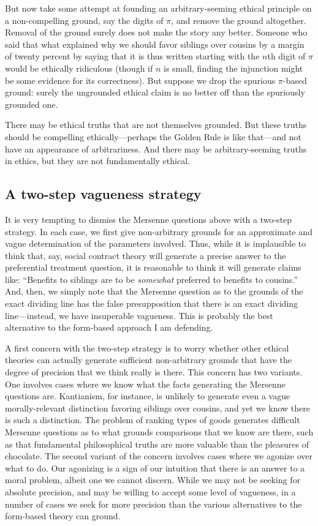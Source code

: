 But now take some attempt at founding an arbitrary-seeming ethical principle on a non-compelling ground, say the digits of $\pi$, and remove the ground altogether. Removal
of the ground surely does not make the story any better. Someone who said that what explained why we should favor siblings over cousins by a margin of
twenty percent by saying that it is thus written starting with the $n$th digit of $\pi$ would be ethically ridiculous (though if $n$ is small, finding
the injunction might be some evidence for its correctness). But suppose we drop the spurious $\pi$-based ground: surely the ungrounded ethical claim is
no better off than the spuriously grounded one. 

There may be ethical truths that are not themselves grounded. But these truths should be compelling ethically---perhaps the Golden Rule is like that---and not 
have an appearance of arbitrariness. And there may be arbitrary-seeming truths in ethics, but they are not fundamentally ethical.

\subsection{A two-step vagueness strategy}
It is very tempting to dismiss the Mersenne questions above with a two-step strategy. In each case, we first give non-arbitrary grounds for 
an approximate and vague determination of the parameters involved. Thus, while it is implausible to think that, say, social contract theory
will generate a precise answer to the preferential treatment question, it is reasonable to think it will generate claims like: ``Benefits to 
siblings are to be \textit{somewhat} preferred to benefits to cousins.'' And, then, we simply note that the Mersenne question as to the grounds
of the exact dividing line has the false presupposition that there is an exact dividing line---instead, we have insuperable vagueness.
This is probably the best alternative to the form-based approach I am defending.

A first concern with the two-step strategy is to worry whether other ethical theories can actually generate sufficient non-arbitrary grounds
that have the degree of precision that we think really is there. 
This concern has two variants. One involves cases where we know what the facts generating the Mersenne questions are.
Kantianism, for instance, is unlikely to generate even a vague morally-relevant 
distinction favoring siblings over cousins, and yet we know there is such a distinction. The problem of ranking types of goods generates difficult 
Mersenne questions as to what grounds comparisons that we know are there, such as that fundamental philosophical truths are more valuable than the 
pleasures of chocolate. The second variant of the concern involves cases where we agonize over what to do. Our agonizing is a sign of our intuition
that there is an answer to a moral problem, albeit one we cannot discern. While we may not be seeking for absolute precision, and may be willing
to accept some level of vagueness, in a number of cases we seek for more precision than the various alternatives to the form-based theory can ground. 

